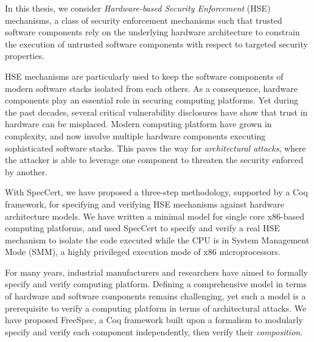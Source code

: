 In this thesis, we consider \emph{Hardware-based Security Enforcement} (HSE)
mechanisms, a class of security enforcement mechanisms such that trusted
software components rely on the underlying hardware architecture to constrain
the execution of untrusted software components with respect to targeted
security properties.

HSE mechanisms are particularly used to keep the software components of modern
software stacks isolated from each others.
%
As a consequence, hardware components play an essential role in securing
computing platforms.
%
Yet during the past decades, several critical vulnerability disclosures have
show that trust in hardware can be misplaced.
%
Modern computing platform have grown in complexity, and now involve multiple
hardware components executing sophisticated software stacks.
%
This paves the way for \emph{architectural attacks}, where the attacker is
able to leverage one component to threaten the security enforced by another.

With SpecCert, we have proposed a three-step methodology, supported by a Coq
framework, for specifying and verifying HSE mechanisms against hardware
architecture models.
%
We have written a minimal model for single core x86-based computing platforms,
and used SpecCert to specify and verify a real HSE mechanism to isolate the
code executed while the CPU is in System Management Mode (SMM), a highly
privileged execution mode of x86 microprocessors.

For many years, industrial manufacturers and researchers have aimed to
formally specify and verify computing platform.
%
Defining a comprehensive model in terms of hardware and software components
remains challenging, yet such a model is a prerequisite to verify a computing
platform in terms of architectural attacks.
%
We have proposed FreeSpec, a Coq framework built upon a formalism to modularly
specify and verify each component independently, then verify their
\emph{composition}.